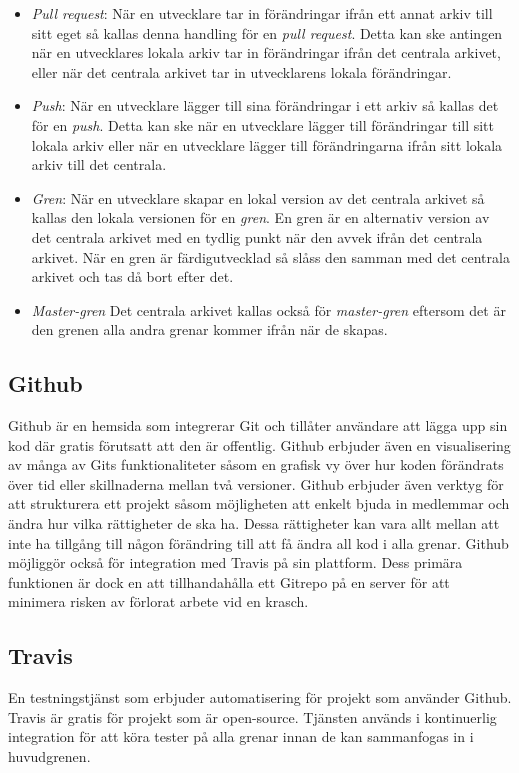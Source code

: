 \begin{itemize}
	\item \textit{Pull request}: När en utvecklare tar in förändringar ifrån ett annat arkiv till sitt eget så kallas denna handling för en \textit{pull request}. Detta kan ske antingen när en utvecklares lokala arkiv tar in förändringar ifrån det centrala arkivet, eller när det centrala arkivet tar in utvecklarens lokala förändringar.
	
	\item \textit{Push}: När en utvecklare lägger till sina förändringar i ett arkiv så kallas det för en \textit{push}. Detta kan ske när en utvecklare lägger till förändringar till sitt lokala arkiv eller när en utvecklare lägger till förändringarna ifrån sitt lokala arkiv till det centrala.
	
	\item \textit{Gren}: När en utvecklare skapar en lokal version av det centrala arkivet så kallas den lokala versionen för en \textit{gren}. En gren är en alternativ version av det centrala arkivet med en tydlig punkt när den avvek ifrån det centrala arkivet. När en gren är färdigutvecklad så slåss den samman med det centrala arkivet och tas då bort efter det.
	
	\item \textit{Master-gren} Det centrala arkivet kallas också för \textit{master-gren} eftersom det är den grenen alla andra grenar kommer ifrån när de skapas.
\end{itemize}


\subsection*{Github}
Github är en hemsida som integrerar Git och tillåter användare att lägga upp sin kod där gratis förutsatt att den är offentlig. Github erbjuder även en visualisering av många av Gits funktionaliteter såsom en grafisk vy över hur koden förändrats över tid eller skillnaderna mellan två versioner. Github erbjuder även verktyg för att strukturera ett projekt såsom möjligheten att enkelt bjuda in medlemmar och ändra hur vilka rättigheter de ska ha. Dessa rättigheter kan vara allt mellan att inte ha tillgång till någon förändring till att få ändra all kod i alla grenar. Github möjliggör också för integration med Travis på sin plattform. Dess primära funktionen är dock en att tillhandahålla ett Gitrepo på en server för att minimera risken av förlorat arbete vid en krasch.

\subsection*{Travis}
En testningstjänst som erbjuder automatisering för projekt som använder Github. Travis är gratis för projekt som är open-source. Tjänsten används i kontinuerlig integration för att köra tester på alla grenar innan de kan sammanfogas in i huvudgrenen\cite{Travis}.

